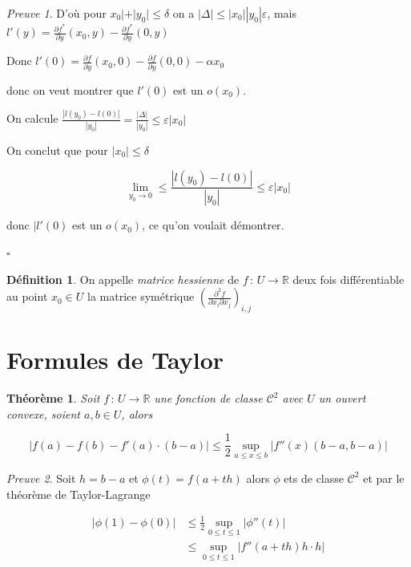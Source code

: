 \documentclass[]{article}
\newtheorem{mythm}{Théorème}
\theoremstyle{remark}
\newtheorem{myproof}{Preuve}
\theoremstyle{definition}
\newtheorem{mydef}{Définition}
\newcommand{\cqfd}{
	\hfill$\square$
}
\newcommand{\funcshort}[3]{
#1 \, : \, #2 \longrightarrow #3
}
\begin{document}
\begin{myproof}
		D'où pour $x_0| + |y_0| \leqslant \delta$ on a $|\Delta| \leqslant |x_0||y_0|\varepsilon$, mais $\displaystyle l'(y) = \frac{\partial f^*}{\partial y}(x_0, y) - \frac{\partial f^*}{\partial y}(0, y)$
		
		Donc $\displaystyle l'(0) = \frac{\partial f}{\partial y}(x_0, 0) - \frac{\partial f}{\partial y}(0, 0) - \alpha x_0$
		
		donc on veut montrer que $l'(0)$ est un $o(x_0)$.
		
		On calcule $\displaystyle \frac{|l(y_0) - l(0)|}{|y_0|} = \frac{|\Delta|}{|y_0|} \leqslant \varepsilon |x_0|$
		
		On conclut que pour $|x_0| \leqslant \delta$
		
		$$\lim\limits_{y_0 \to 0} \leqslant \frac{|l(y_0) - l(0)|}{|y_0|} \leqslant \varepsilon |x_0|$$
		
		donc $|l'(0)$ est un $o(x_0)$, ce qu'on voulait démontrer.
		
		\cqfd
\end{myproof}

\begin{mydef}
	On appelle \textit{matrice hessienne} de $\funcshort{f}{U}{\mathbb{R}}$ deux fois différentiable au point $x_0 \in U$ la matrice symétrique $\displaystyle \left(\frac{\partial^2 f}{\partial x_i \partial x_j}\right)_{i, j}$
\end{mydef}

\section{Formules de Taylor}

\begin{mythm}
	Soit $\funcshort{f}{U}{\mathbb{R}}$ une fonction de classe $\mathcal{C}^2$ avec $U$ un ouvert convexe, soient $a, b \in U$, alors
	
	$$|f(a) - f(b) - f'(a) \cdot (b-a)| \leqslant \frac{1}{2} \sup_{a \leqslant x \leqslant b} |f''(x) (b - a, b-a)|$$
\end{mythm}

\begin{myproof}
	Soit $h = b - a$ et $\phi(t) = f(a+th)$ alors $\phi$ ets de classe $\mathcal{C}^2$ et par le théorème de Taylor-Lagrange
	
	$$\begin{aligned}
	|\phi(1) - \phi(0)| &\leqslant \frac{1}{2} \sup_{0 \leqslant t \leqslant 1} |\phi''(t)| \\
	&\leqslant \sup_{0 \leqslant t \leqslant 1} |f''(a+th)h \cdot h|
	\end{aligned}$$
\end{myproof}
\end{document}
